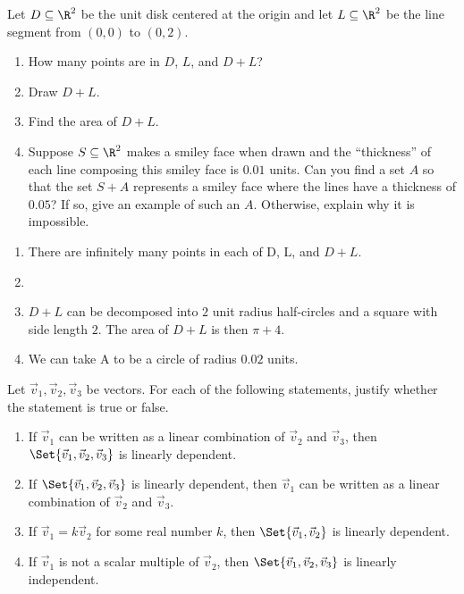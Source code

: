 \begin{exercises}
\begin{problist}
		\prob Let $D\subseteq\R^2$ be the unit disk centered at the origin and let $L\subseteq \R^2$ be
		the line segment from $(0,0)$ to $(0,2)$.
		\begin{enumerate}
			\item How many points are in $D$, $L$, and $D+L$?
			\item Draw $D+L$.
			\item Find the area of $D+L$.
			\item Suppose $S\subseteq\R^2$ makes a smiley face when drawn and the ``thickness'' of
			each line composing this smiley face is $0.01$ units. Can you find a set $A$ so
			that the set $S+A$ represents a smiley face where the lines have a thickness of $0.05$?
			If so, give an example of such an $A$. Otherwise, explain why it is impossible.
		\end{enumerate}
		\begin{solution}
			\begin{enumerate}
				\item There are infinitely many points in each of D, L, and $D+L$.
				\item %
				\item $D+L$ can be decomposed into $2$ unit radius half-circles and a square with side length
				$2$. The area of $D+L$ is then $\pi+4$.
				\item We can take A to be a circle of radius $0.02$ units.
			\end{enumerate}
		\end{solution}
		
		\prob Let $\vec v_{1}, \vec v_{2}, \vec v_{3}$ be vectors. For each of the following statements,
		justify whether the statement is true or false.
		\begin{enumerate}
			\item If $\vec v_{1}$ can be written as a linear combination
			of $\vec v_{2}$ and $\vec v_{3}$, then $\Set{\vec
				v_1,\vec v_2,\vec v_3}$ is linearly dependent.
			
			\item If $\Set{\vec v_1,\vec v_2,\vec v_3}$ is linearly dependent,
			then $\vec v_{1}$ can be written as a linear combination
			of $\vec v_{2}$ and $\vec v_{3}$.
			
			\item If $\vec v_{1}=k\vec v_{2}$ for some real number $k$,
			then $\Set{\vec v_1,\vec v_2}$ is linearly dependent.
			
			\item If $\vec v_{1}$ is not a scalar multiple of $\vec
			v_{2}$, then $\Set{\vec v_1,\vec v_2,\vec v_3}$ is
			linearly independent.
			

\end{enumerate}
\end{problist}
\end{exercises}
